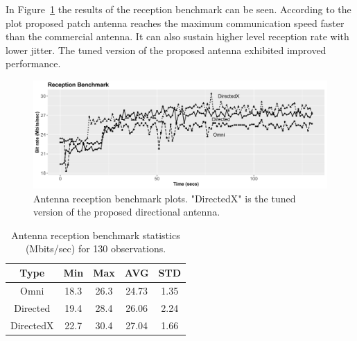 \documentclass[12pt, oneandhalf, chaparabic, sees, ms]{metu}
\begin{document}
\newpage

In Figure~\ref{fig:rx-bench} the results of the reception benchmark can be seen. 
According to the plot proposed patch antenna reaches the maximum communication speed faster than the commercial antenna. 
It can also sustain higher level reception rate with lower jitter. 
The tuned version of the proposed antenna exhibited improved performance.

\vspace{2cm}


\begin{figure}[!htbp]
 \begin{center}
  \includegraphics[width=\textwidth]{rx-graph2-bw.png}
 \end{center}
 \caption{Antenna reception benchmark plots. "DirectedX" is the tuned version of the proposed directional antenna.}
  \label{fig:rx-bench}
\end{figure}



\vspace{1cm}

\renewcommand{\arraystretch}{1.2}%
\begin{table}[H]
\begin{center}
\caption{Antenna reception benchmark statistics (Mbits/sec) for 130 observations.}
\label{tab:rx-stat}
\begin{adjustbox}{max width=\textwidth}
\begin{tabular}{|c | c | c | c | c |}
\hline
\rowcolor{lightgray}
\textbf{Type} & \textbf{Min} & \textbf{Max} & \textbf{AVG} & \textbf{STD}\tabularnewline
\hline \hline 
\cellcolor{lightgray} Omni       &   18.3     &  26.3    &   24.73     &   1.35      \tabularnewline \hline
\cellcolor{lightgray} Directed   &   19.4     &  28.4    &   26.06     &   2.24     \tabularnewline \hline
\cellcolor{lightgray} DirectedX  &   22.7     &  30.4    &   27.04     &   1.66     \tabularnewline \hline
\end{tabular}
\end{adjustbox}
\end{center}
\end{table}
\renewcommand{\arraystretch}{1}%
\end{document}
